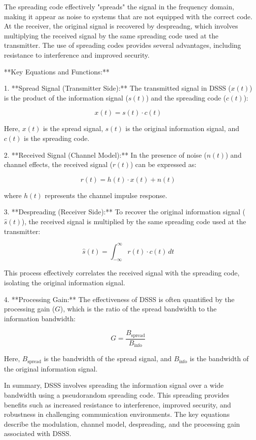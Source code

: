 \documentclass[colorlinks,11pt,a4paper,normalphoto,withhyper,ragged2e]{altareport}
\begin{document}
				The spreading code effectively "spreads" the signal in the frequency domain, making it appear as noise to systems that are not equipped with the correct code. At the receiver, the original signal is recovered by despreadng, which involves multiplying the received signal by the same spreading code used at the transmitter. The use of spreading codes provides several advantages, including resistance to interference and improved security.
				
				**Key Equations and Functions:**
				
				1. **Spread Signal (Transmitter Side):**
				The transmitted signal in DSSS (\(x(t)\)) is the product of the information signal (\(s(t)\)) and the spreading code (\(c(t)\)):
				
				\[ x(t) = s(t) \cdot c(t) \]
				
				Here, \(x(t)\) is the spread signal, \(s(t)\) is the original information signal, and \(c(t)\) is the spreading code.
				
				2. **Received Signal (Channel Model):**
				In the presence of noise (\(n(t)\)) and channel effects, the received signal (\(r(t)\)) can be expressed as:
				
				\[ r(t) = h(t) \cdot x(t) + n(t) \]
				
				where \(h(t)\) represents the channel impulse response.
				
				3. **Despreading (Receiver Side):**
				To recover the original information signal (\(\hat{s}(t)\)), the received signal is multiplied by the same spreading code used at the transmitter:
				
				\[ \hat{s}(t) = \int_{-\infty}^{\infty} r(t) \cdot c(t) \, dt \]
				
				This process effectively correlates the received signal with the spreading code, isolating the original information signal.
				
				4. **Processing Gain:**
				The effectiveness of DSSS is often quantified by the processing gain (\(G\)), which is the ratio of the spread bandwidth to the information bandwidth:
				
				\[ G = \frac{B_{\text{spread}}}{B_{\text{info}}} \]
				
				Here, \(B_{\text{spread}}\) is the bandwidth of the spread signal, and \(B_{\text{info}}\) is the bandwidth of the original information signal.
				
				In summary, DSSS involves spreading the information signal over a wide bandwidth using a pseudorandom spreading code. This spreading provides benefits such as increased resistance to interference, improved security, and robustness in challenging communication environments. The key equations describe the modulation, channel model, despreading, and the processing gain associated with DSSS.
				
\end{document}

